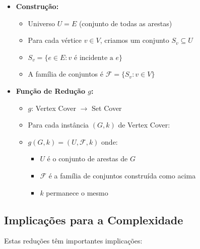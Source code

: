 \documentclass[12pt, a4paper]{report}
\begin{document}
\begin{itemize}
    \item \textbf{Construção:}
    \begin{itemize}
        \item Universo $U = E$ (conjunto de todas as arestas)
        \item Para cada vértice $v \in V$, criamos um conjunto $S_v \subseteq U$
        \item $S_v = \{e \in E : v \text{ é incidente a } e\}$
        \item A família de conjuntos é $\mathcal{F} = \{S_v : v \in V\}$
    \end{itemize}
    
    \item \textbf{Função de Redução $g$:}
    \begin{itemize}
        \item $g$: Vertex Cover $\rightarrow$ Set Cover
        \item Para cada instância $(G, k)$ de Vertex Cover:
        \item $g(G, k) = (U, \mathcal{F}, k)$ onde:
            \begin{itemize}
                \item $U$ é o conjunto de arestas de $G$
                \item $\mathcal{F}$ é a família de conjuntos construída como acima
                \item $k$ permanece o mesmo
            \end{itemize}
    \end{itemize}
\end{itemize}

\subsection{Implicações para a Complexidade}
Estas reduções têm importantes implicações:
\end{document}
